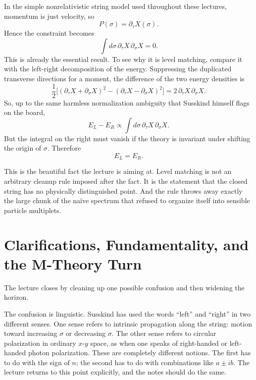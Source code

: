 In the simple nonrelativistic string model used throughout these lectures, momentum is just velocity, so
\begin{equation}
P(\sigma)=\partial_\tau X(\sigma).
\end{equation}
Hence the constraint becomes
\begin{equation}
\int d\sigma\,\partial_\tau X\,\partial_\sigma X=0.
\end{equation}
This is already the essential result. To see why it is level matching, compare it with the left-right decomposition of the energy. Suppressing the duplicated transverse directions for a moment, the difference of the two energy densities is
\begin{equation}
\frac12
\Big[
(\partial_\tau X+\partial_\sigma X)^2
-
(\partial_\tau X-\partial_\sigma X)^2
\Big]
=
2\,\partial_\tau X\,\partial_\sigma X.
\end{equation}
So, up to the same harmless normalization ambiguity that Susskind himself flags on the board,
\begin{equation}
E_L-E_R \propto \int d\sigma\,\partial_\tau X\,\partial_\sigma X.
\end{equation}
But the integral on the right must vanish if the theory is invariant under shifting the origin of \(\sigma\). Therefore
\begin{equation}
E_L=E_R.
\end{equation}

This is the beautiful fact the lecture is aiming at. Level matching is not an arbitrary cleanup rule imposed after the fact. It is the statement that the closed string has no physically distinguished point. And the rule throws away exactly the large chunk of the naïve spectrum that refused to organize itself into sensible particle multiplets.

\section{Clarifications, Fundamentality, and the M-Theory Turn}

The lecture closes by cleaning up one possible confusion and then widening the horizon.

The confusion is linguistic. Susskind has used the words ``left'' and ``right'' in two different senses. One sense refers to intrinsic propagation along the string: motion toward increasing \(\sigma\) or decreasing \(\sigma\). The other sense refers to circular polarization in ordinary \(x\)-\(y\) space, as when one speaks of right-handed or left-handed photon polarization. These are completely different notions. The first has to do with the sign of \(n\); the second has to do with combinations like \(a\pm i b\). The lecture returns to this point explicitly, and the notes should do the same.

